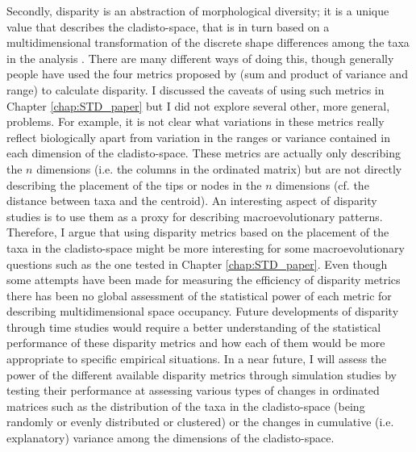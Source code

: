 Secondly, disparity is an abstraction of morphological diversity; it is a unique value that describes the cladisto-space, that is in turn based on a multidimensional transformation of the discrete shape differences among the taxa in the analysis \citep{Wills1994,foote1997evolution}.
There are many different ways of doing this, though generally people have used the four metrics proposed by \cite{Wills1994} (sum and product of variance and range) to calculate disparity.
I discussed the caveats of using such metrics in Chapter \ref{chap:STD_paper} but I did not explore several other, more general, problems.
For example, it is not clear what variations in these metrics really reflect biologically apart from variation in the ranges or variance contained in each dimension of the cladisto-space.
These metrics are actually only describing the $n$ dimensions (i.e. the columns in the ordinated matrix) but are not directly describing the placement of the tips or nodes in the $n$ dimensions (cf. the distance between taxa and the centroid).
An interesting aspect of disparity studies is to use them as a proxy for describing macroevolutionary patterns.%
Therefore, I argue that using disparity metrics based on the placement of the taxa in the cladisto-space might be more interesting for some macroevolutionary questions such as the one tested in Chapter \ref{chap:STD_paper}.
Even though some attempts have been made for measuring the efficiency of disparity metrics \citep{Ciampaglio2001} there has been no global assessment of the statistical power of each metric for describing multidimensional space occupancy.
Future developments of disparity through time studies would require a better understanding of the statistical performance of these disparity metrics and how each of them would be more appropriate to specific empirical situations.
In a near future, I will assess the power of the different available disparity metrics \citep[e.g.][]{Wills1994,Ciampaglio2004,Hughes20082013,huang2015origins} through simulation studies by testing their performance at assessing various types of changes in ordinated matrices such as the distribution of the taxa in the cladisto-space (being randomly or evenly distributed or clustered) or the changes in cumulative (i.e. explanatory) variance among the dimensions of the cladisto-space.

